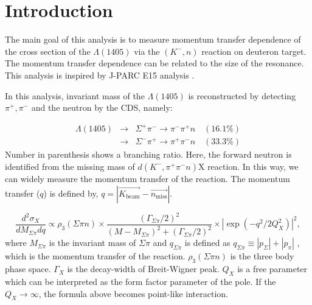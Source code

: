\section{Introduction}
The main goal of this analysis is to measure momentum transfer dependence of the cross section of the $\Lambda (1405)$ via the $(K^-,n)$ reaction on deuteron target.
The momentum transfer dependence can be related to the size of the resonance.
This analysis is inspired by J-PARC E15 analysis \cite{Sada:2016nkb,Ajimura:2018iyx}.

In this analysis, invariant mass of the $\Lambda (1405)$ is reconstructed by detecting $\pi^{+},\pi^-$ and the neutron by the CDS, namely:

\begin{eqnarray}
\Lambda (1405) & \rightarrow & \Sigma^+\pi^-  \rightarrow {\pi^-\pi^+}n \quad (16.1\%)  \nonumber \\
               & \rightarrow & \Sigma^-\pi^+  \rightarrow {\pi^+\pi^-}n \quad (33.3\%)
\end{eqnarray}
Number in parenthesis shows a branching ratio.
Here, the forward neutron is identified from the missing mass of 
$d(K^-,\pi^+\pi^-n)$X reaction. In this way, we can widely measure the momentum transfer of the \reaction reaction. 
The momentum transfer ($q$) is defined by, $q=|\overrightarrow{K_{\mbox{beam}}} - \overrightarrow{n_{\mbox{miss}}}|$.


\begin{equation} \label{formfactor} 
  \frac{d^2 \sigma _X}{dM_{\Sigma \pi} dq} \propto \rho _{3}(\Sigma \pi n) \times \frac{(\Gamma _{\Sigma \pi} /2)^2}{(M - M_{\Sigma \pi})^2 + (\Gamma _{\Sigma \pi} /2)^2 } \times  | \exp{(-q^2/2Q_{X}^2)}|^2 ,
\end{equation} 
where $M_{\Sigma \pi}$ is the invariant mass of $\Sigma \pi$ and $q_{\Sigma \pi}$ is defined as $ q_{\Sigma \pi} \equiv |p_\Sigma| + |p_\pi| $ , which is the momentum transfer of the reaction. $\rho_{3}(\Sigma \pi n) $ is the three body phase space. $\Gamma_X$ is the decay-width of Breit-Wigner peak. $Q_X$ is a free parameter which can be interpreted as the form factor parameter of the pole.  
If the $Q_X \to \infty $, the formula above becomes point-like interaction.

